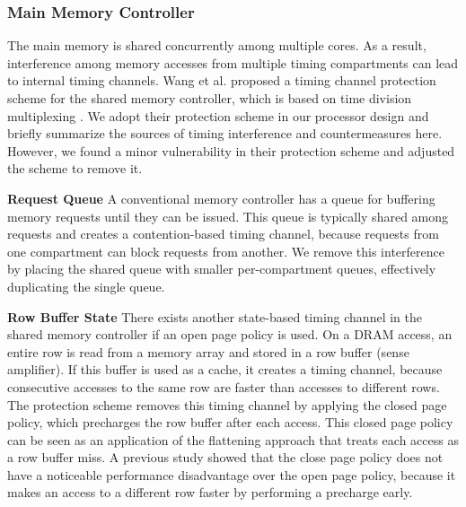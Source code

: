 \subsubsection{Main Memory Controller}

The main memory is shared concurrently among multiple cores. As a result,
interference among memory accesses from multiple timing compartments can lead
to internal timing channels. 
Wang et al. proposed a timing channel protection scheme for the shared memory
controller, which is based on time division multiplexing \cite{ushpca14}. 
We adopt their protection scheme in our processor design and briefly summarize 
the sources of timing interference and countermeasures here.
However, we found a minor vulnerability in their protection scheme and
adjusted the scheme to remove it.

\textbf{Request Queue}
A conventional memory controller has a queue for buffering memory requests until
they can be issued. This queue is typically shared among requests and creates
a contention-based timing channel, because requests from one compartment can block
requests from another. We remove this interference by placing the shared 
queue with smaller per-compartment queues, effectively duplicating the single queue.

\textbf{Row Buffer State}
There exists another state-based timing channel in the shared memory controller
if an open page policy is used. On a DRAM access, an entire row is read from
a memory array and stored in a row buffer (sense amplifier). If this buffer is
used as a cache, it creates a timing channel, because consecutive accesses to 
the same row are faster than accesses to different rows.
The protection scheme removes this timing channel by applying the closed page
policy, which precharges the row buffer after each access. This
closed page policy can be seen as an application of the flattening approach that
treats each access as a row buffer miss.
A previous study \cite{ushpca14} showed that the close page policy does
not have a noticeable performance disadvantage over the open page policy, because it
makes an access to a different row faster by performing a precharge early.

